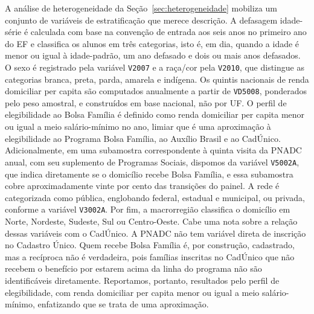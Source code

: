 A análise de heterogeneidade da Seção~\ref{sec:heterogeneidade}
mobiliza um conjunto de variáveis de estratificação que merece
descrição. A defasagem idade-série é calculada com base na
convenção de entrada aos seis anos no primeiro ano do EF e
classifica os alunos em três categorias, isto é, em dia, quando a
idade é menor ou igual à idade-padrão, um ano defasado e dois ou
mais anos defasados. O sexo é registrado pela variável
\texttt{V2007} e a raça/cor pela \texttt{V2010}, que distingue as
categorias branca, preta, parda, amarela e indígena. Os quintis
nacionais de renda domiciliar per capita são computados anualmente
a partir de \texttt{VD5008}, ponderados pelo peso amostral, e
construídos em base nacional, não por UF. O perfil de elegibilidade
ao Bolsa Família é definido como renda domiciliar per capita
menor ou igual a meio salário-mínimo no ano, limiar que é uma
aproximação à elegibilidade ao Programa Bolsa Família, ao Auxílio
Brasil e ao CadÚnico. Adicionalmente, em uma subamostra
correspondente à quinta visita da PNADC anual, com seu suplemento
de Programas Sociais, dispomos da variável \texttt{V5002A}, que
indica diretamente se o domicílio recebe Bolsa Família, e essa
subamostra cobre aproximadamente vinte por cento das transições
do painel. A rede é categorizada como pública, englobando federal,
estadual e municipal, ou privada, conforme a variável
\texttt{V3002A}. Por fim, a macrorregião classifica o domicílio
em Norte, Nordeste, Sudeste, Sul ou Centro-Oeste. Cabe uma nota
sobre a relação dessas variáveis com o CadÚnico. A PNADC não tem
variável direta de inscrição no Cadastro Único. Quem recebe Bolsa
Família é, por construção, cadastrado, mas a recíproca não é
verdadeira, pois famílias inscritas no CadÚnico que não recebem o
benefício por estarem acima da linha do programa não são
identificáveis diretamente. Reportamos, portanto, resultados pelo
perfil de elegibilidade, com renda domiciliar per capita menor ou
igual a meio salário-mínimo, enfatizando que se trata de uma
aproximação.
